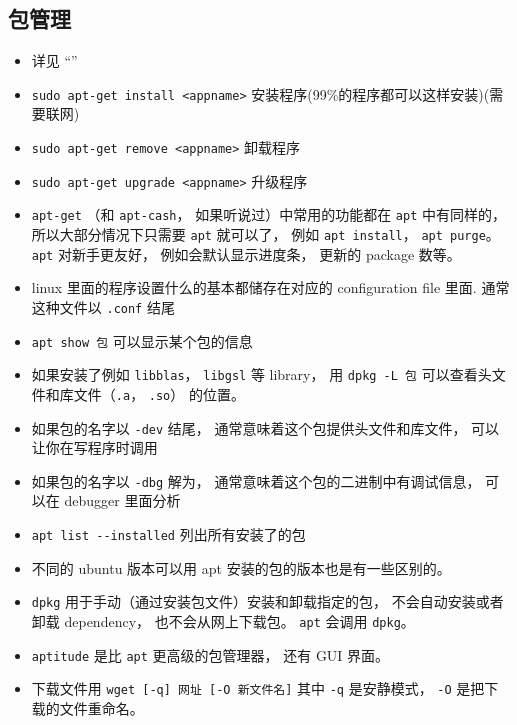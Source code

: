 \subsection{包管理}
\begin{itemize}
\item 详见 “”
\item \verb`sudo apt-get install <appname>` 安装程序(99\%的程序都可以这样安装)(需要联网)
\item \verb`sudo apt-get remove <appname>` 卸载程序
\item \verb`sudo apt-get upgrade <appname>` 升级程序
\item \verb`apt-get` （和 \verb`apt-cash`， 如果听说过）中常用的功能都在 \verb`apt` 中有同样的， 所以大部分情况下只需要 \verb`apt` 就可以了， 例如 \verb`apt install`， \verb`apt purge`。 \verb`apt` 对新手更友好， 例如会默认显示进度条， 更新的 package 数等。
\item linux 里面的程序设置什么的基本都储存在对应的 configuration file 里面. 通常这种文件以 \verb`.conf` 结尾
\item \verb`apt show 包` 可以显示某个包的信息
\item 如果安装了例如 \verb`libblas`， \verb`libgsl` 等 library， 用 \verb`dpkg -L 包` 可以查看头文件和库文件（\verb`.a`， \verb`.so`） 的位置。
\item 如果包的名字以 \verb`-dev` 结尾， 通常意味着这个包提供头文件和库文件， 可以让你在写程序时调用
\item 如果包的名字以 \verb`-dbg` 解为， 通常意味着这个包的二进制中有调试信息， 可以在 debugger 里面分析
\item \verb`apt list --installed` 列出所有安装了的包
\item 不同的 ubuntu 版本可以用 apt 安装的包的版本也是有一些区别的。
\item \verb`dpkg` 用于手动（通过安装包文件）安装和卸载指定的包， 不会自动安装或者卸载 dependency， 也不会从网上下载包。 \verb`apt` 会调用 \verb`dpkg`。
\item \verb`aptitude` 是比 \verb`apt` 更高级的包管理器， 还有 GUI 界面。
\item 下载文件用 \verb`wget [-q] 网址 [-O 新文件名]` 其中 \verb`-q` 是安静模式， \verb`-O` 是把下载的文件重命名。
\end{itemize}

